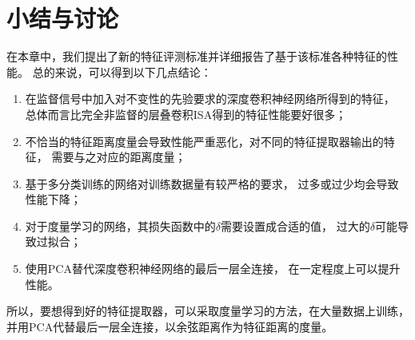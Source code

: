 \section{小结与讨论\label{sec:expr:discuss}}
在本章中，我们提出了新的特征评测标准并详细报告了基于该标准各种特征的性能。
总的来说，可以得到以下几点结论：
\begin{enumerate}
    \item 在监督信号中加入对不变性的先验要求的深度卷积神经网络所得到的特征，
        总体而言比完全非监督的层叠卷积ISA得到的特征性能要好很多；
    \item 不恰当的特征距离度量会导致性能严重恶化，对不同的特征提取器输出的特征，
        需要与之对应的距离度量；
    \item 基于多分类训练的网络对训练数据量有较严格的要求，
        过多或过少均会导致性能下降；
    \item 对于度量学习的网络，其损失函数中的$\delta$需要设置成合适的值，
        过大的$\delta$可能导致过拟合；
    \item 使用PCA替代深度卷积神经网络的最后一层全连接，
        在一定程度上可以提升性能。
\end{enumerate}

所以，要想得到好的特征提取器，可以采取度量学习的方法，在大量数据上训练，
并用PCA代替最后一层全连接，以余弦距离作为特征距离的度量。




